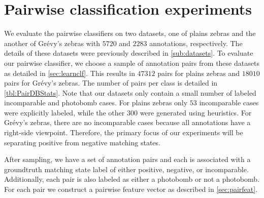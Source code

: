 \section{Pairwise classification experiments}\label{sec:pairexpt}


    We evaluate the pairwise classifiers on two datasets, one of plains zebras and the another of Grévy's zebras
      with $5720$ and $2283$ annotations, respectively.
    The details of these datasets were previously described in \cref{sub:datasets}.
    To evaluate our pairwise classifier, we choose a sample of annotation pairs from these datasets as detailed
      in \cref{sec:learnclf}.
    This results in $47312$ pairs for plains zebras and $18010$ pairs for Grévy's zebras.
    The number of pairs per class is detailed in \cref{tbl:PairDBStats}.
    Note that our datasets only contain a small number of labeled incomparable and photobomb cases.
    For plains zebras only $53$ incomparable cases were explicitly labeled, while the other $300$ were generated
      using heuristics.
    For Grévy's zebras, there are no incomparable cases because all annotations have a right-side viewpoint.
    Therefore, the primary focus of our experiments will be separating positive from negative matching states.

    \PairDBStats{}


    After sampling, we have a set of annotation pairs and each is associated with a groundtruth matching state
      label of either positive, negative, or incomparable.
    Additionally, each pair is also labeled as either a photobomb or not a photobomb.
    For each pair we construct a pairwise feature vector as described in \cref{sec:pairfeat}.

